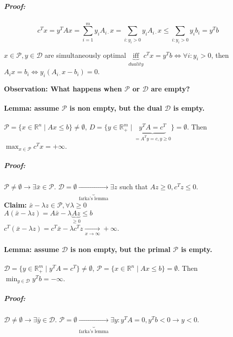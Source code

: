 \documentclass[main]{subfiles}
\begin{document}
\subparagraph{Proof:}
\begin{equation} \label{eq:proof-weak-slackness}
c^T x = y^T Ax = \sum_{i=1}^{m} y_i A_{i\cdot} x = \sum_{i: y_i > 0} y_i A_{i
\cdot} x \leq \sum_{i: y_i > 0} y_i b_i = y^T b
\end{equation}

$x \in \mathcal{P}, y \in \mathcal{D}$ are simultaneously optimal 
$\underbrace{\text{iff}}_{duality} c^T x = y^T b \iff \forall i: y_i > 0$, then
$A_i x = b_i \iff y_i(A_{i\cdot}x - b_i) = 0$.

\textbf{Observation: What happens when $\mathcal{P}$ or $\mathcal{D}$ are
empty?}

\paragraph{Lemma: assume $\mathcal{P}$ is non empty, but the dual $\mathcal{D}$
is empty.}
$\mathcal{P} = \{ x \in \mathbb{R}^n \mid Ax \leq b \} \neq \emptyset$,
$D = \{y \in \mathbb{R}^m_+ \mid \underbrace{y^T A = c^T}_{= A^T y = c, y \geq
0} \} =  \emptyset$. Then $\displaystyle \max_{x \in \mathcal{P}} c^{T}
x = +\infty$.

\subparagraph{Proof:}
$\mathcal{P} \neq \emptyset \rightarrow \exists \bar{x} \in \mathcal{P}$.
$\mathcal{D} = \emptyset \underbrace{\rightarrow}_{\text{farka's lemma}}
\exists z$ such that $Az \geq 0, c^T z \leq 0$. \\

\textbf{Claim:} $\bar{x} - \lambda z \in \mathcal{P}, \forall \lambda \geq 0$\\
$A(\bar{x} - \lambda z) = A\bar{x} - \lambda \underbrace{Az}_{\geq 0} \leq b$\\
$c^T(\bar{x} - \lambda z) = c^T \bar{x} - \lambda c^T z \xrightarrow[x \to
\infty]{} +\infty$.

\paragraph{Lemma: assume $\mathcal{D}$ is non empty, but the primal
$\mathcal{P}$ is empty.}
$\mathcal{D} = \{y \in \mathbb{R}^m_+ \mid y^T A = c^T \} \neq \emptyset$,
$\mathcal{P} = \{x \in \mathbb{R}^n \mid Ax \leq b \} = \emptyset$. Then
$\displaystyle \min_{y \in \mathcal{D}} y^{T} b = -\infty$.

\subparagraph{Proof:}
$\mathcal{D} \neq \emptyset \rightarrow \exists \bar{y} \in \mathcal{D}$.
$\mathcal{P} = \emptyset \underbrace{\rightarrow}_{\text{farka's lemma}} 
\exists y: y^T A = 0, y^T b < 0 \rightarrow y < 0$.
\end{document}
